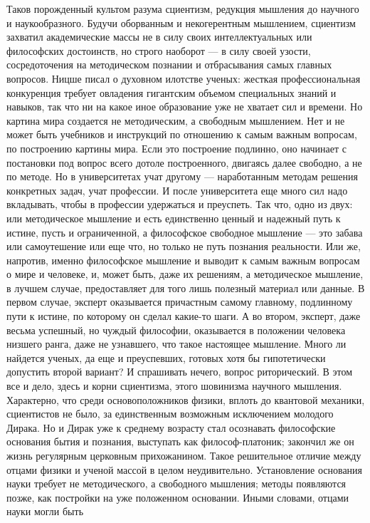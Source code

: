 \begin{multicols}{3}
Таков порожденный культом разума сциентизм, редукция мышления до научного и
наукообразного. Будучи оборванным и некогерентным мышлением, сциентизм захватил
академические массы не в силу своих интеллектуальных или философских
достоинств, но строго наоборот — в силу своей узости, сосредоточения на
методическом познании и отбрасывания самых главных вопросов. Ницше писал о
духовном илотстве ученых: жесткая профессиональная конкуренция требует
овладения гигантским объемом специальных знаний и навыков, так что ни на какое
иное образование уже не хватает сил и времени. Но картина мира создается не
методическим, а свободным мышлением. Нет и не может быть учебников и инструкций
по отношению к самым важным вопросам, по построению картины мира. Если это
построение подлинно, оно начинает с постановки под вопрос всего дотоле
построенного, двигаясь далее свободно, а не по методе. Но в университетах учат
другому — наработанным методам решения конкретных задач, учат профессии. И
после университета еще много сил надо вкладывать, чтобы в профессии удержаться
и преуспеть. Так что, одно из двух: или методическое мышление и есть
единственно ценный и надежный путь к истине, пусть и ограниченной, а
философское свободное мышление — это забава или самоутешение или еще что, но
только не путь познания реальности. Или же, напротив, именно философское
мышление и выводит к самым важным вопросам о мире и человеке, и, может быть,
даже их решениям, а методическое мышление, в лучшем случае, предоставляет для
того лишь полезный материал или данные. В первом случае, эксперт оказывается
причастным самому главному, подлинному пути к истине, по которому он сделал
какие-то шаги. А во втором, эксперт, даже весьма успешный, но чуждый философии,
оказывается в положении человека низшего ранга, даже не узнавшего, что такое
настоящее мышление. Много ли найдется ученых, да еще и преуспевших, готовых
хотя бы гипотетически допустить второй вариант? И спрашивать нечего, вопрос
риторический. В этом все и дело, здесь и корни сциентизма, этого шовинизма
научного мышления. Характерно, что среди основоположников физики, вплоть до
квантовой механики, сциентистов не было, за единственным возможным исключением
молодого Дирака. Но и Дирак уже к среднему возрасту стал осознавать философские
основания бытия и познания, выступать как философ-платоник; закончил же он
жизнь регулярным церковным прихожанином. Такое решительное отличие между отцами
физики и ученой массой в целом неудивительно. Установление основания науки
требует не методического, а свободного мышления; методы появляются позже, как
постройки на уже положенном основании. Иными словами, отцами науки могли быть

\end{multicols}
